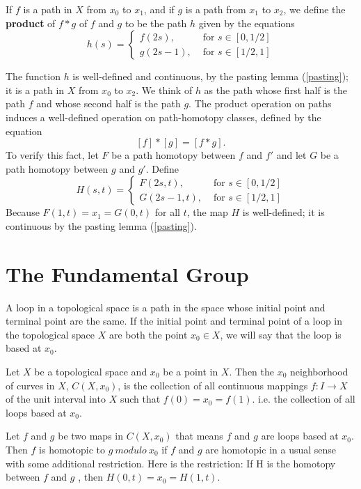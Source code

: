 \medskip
\begin{definition}
If $f$ is a path in $X$ from $x_0$ to $x_1$, and if $g$ is a path from $x_1$ to $x_2$, we define the \textbf{product} of $f\ast g$ of $f$ and $g$ to be the path $h$ given by the equations
$$
h(s)=
\begin{cases}
f(2s),&\mbox{ for }s\in[0,1/2]\\
g(2s-1),&\mbox{ for }s\in[1/2,1]
\end{cases}
$$
\end{definition}
The function $h$ is well-defined and continuous, by the pasting lemma (\ref{pasting}); it is a path in $X$ from $x_0$ to $x_2$. We think of $h$ as the path whose first half is the path $f$ and whose second half is the path $g$.
The product operation on paths induces a well-defined operation on path-homotopy classes, defined by the equation
$$[ f ] \ast [g] = [ f \ast g].$$
To verify this fact, let $F$ be a path homotopy between $f$ and $f'$ and let $G$ be a path homotopy between $g$ and $g'$. Define
$$
H(s,t)=
\begin{cases}
F(2s,t),&\mbox{ for }s\in[0,1/2]\\
G(2s-1,t),&\mbox{ for }s\in[1/2,1]
\end{cases}
$$
Because $F(1, t) = x_1 = G(0, t)$ for all $t$, the map $H$ is well-defined; it is continuous by the pasting lemma (\ref{pasting}).


\section{The Fundamental Group}

\begin{definition}
A loop in a topological space is a path in the space whose initial point and terminal point are the same. If the initial point and terminal point of a loop in the topological space $X$ are both the point $x_0\in X$, we will say that the loop is based at $x_0$.
\end{definition}

Let $X$ be a topological space and $x_0$ be a point in $X$. Then the $x_0$ neighborhood of curves in $X$, $C(X,x_0)$, is the collection of all continuous mappings $f:I\rightarrow X$ of the unit interval into $X$ such that $f(0)=x_0=f(1)$. i.e. the collection of all loops based at $x_0$.


\begin{definition}
Let $f$ and $g$ be two maps in $C(X,x_0)$ that means $f$ and $g$ are loops based at $x_0$. Then $f$ is homotopic to $g~modulo~x_0$ if $f$ and $g$ are homotopic in a usual sense with some additional restriction. Here is the restriction: If H is the homotopy between $f$ and $g$ , then $H(0,t)=x_0=H(1,t)$.
\end{definition}


